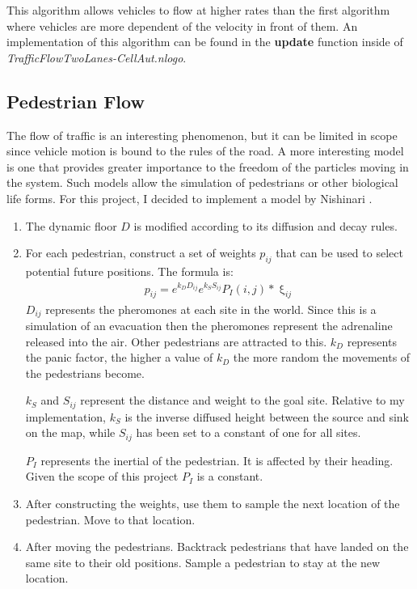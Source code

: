 \documentclass{article}%
\begin{document}
    This algorithm allows vehicles to flow at higher rates than the first algorithm where vehicles are more dependent of the velocity in front of them. An implementation of this algorithm can be found in the {\bf update} function inside of {\it TrafficFlowTwoLanes-CellAut.nlogo}. 

    \subsection{ Pedestrian Flow }
    The flow of traffic is an interesting phenomenon, but it can be limited in scope since vehicle motion is bound to the rules of the road. A more interesting model is one that provides greater importance to the freedom of the particles moving in the system. Such models allow the simulation of pedestrians or other biological life forms. For this project, I decided to implement a model by Nishinari \cite{kats:crowd-flow}.  

    \begin{enumerate}
        \item The dynamic floor $D$ is modified according to its diffusion and decay rules. 
        \item For each pedestrian, construct a set of weights $p_{ij}$ that can be used to select potential future positions. The formula is:
        \begin{align*}
            p_{ij} = e^{k_DD_{ij}}e^{k_SS_{ij}}P_I(i, j) * \upxi_{ij} 
        \end{align*}
        $D_{ij}$ represents the pheromones at each site in the world. Since this is a simulation of an evacuation then the pheromones represent the adrenaline released into the air. Other pedestrians are attracted to this. $k_D$ represents the panic factor, the higher a value of $k_D$ the more random the movements of the pedestrians become. 

        $k_S$ and $S_{ij}$ represent the distance and weight to the goal site. Relative to my implementation, $k_S$ is the inverse diffused height between the source and sink on the map, while $S_{ij}$ has been set to a constant of one for all sites. 

        $P_I$ represents the inertial of the pedestrian. It is affected by their heading. Given the scope of this project $P_I$ is a constant. 
        \item After constructing the weights, use them to sample the next location of the pedestrian. Move to that location. 
        \item After moving the pedestrians. Backtrack pedestrians that have landed on the same site to their old positions. Sample a pedestrian to stay at the new location.
\end{enumerate}
\end{document}
